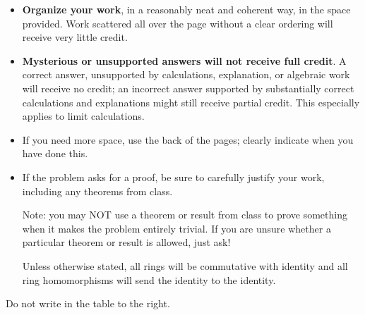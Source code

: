 \documentclass[11pt]{exam}
\theoremstyle{definition}
\begin{document}
\begin{minipage}[t]{3.7in}
\vspace{0pt}
\begin{itemize}


\item \textbf{Organize your work}, in a reasonably neat and coherent way, in
the space provided. Work scattered all over the page without a clear ordering will 
receive very little credit.  

\item \textbf{Mysterious or unsupported answers will not receive full
credit}.  A correct answer, unsupported by calculations, explanation,
or algebraic work will receive no credit; an incorrect answer supported
by substantially correct calculations and explanations might still receive
partial credit.  This especially applies to limit calculations.

\item If you need more space, use the back of the pages; clearly indicate when you have done this.

\item If the problem asks for a proof, be sure to carefully justify your work, including any theorems from class.

Note: you may NOT use a theorem or result from class to prove something when it makes the problem entirely trivial.  If you are unsure whether a particular theorem or result is allowed, just ask!

Unless otherwise stated, all rings will be commutative with identity and all ring homomorphisms will send the identity to the identity.

\end{itemize}

Do not write in the table to the right.
\end{minipage}
\hfill
\begin{minipage}[t]{2.3in}
\vspace{0pt}
\addpoints %
\gradetable[v]%

\end{minipage}
\newpage %
\end{document}
